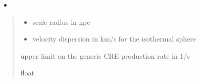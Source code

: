 \documentclass[letterpaper,10pt,english]{sphinxmanual}
\begin{document}
\begin{fulllineitems}
\begin{quote}
\begin{description}
\end{description}\end{quote}
\begin{itemize}
\item {} 
\sphinxAtStartPar
{}

\end{itemize}
\begin{quote}\begin{description}
\begin{itemize}
\item {} 
\sphinxAtStartPar
{} \textendash{} scale radius in kpc

\item {} 
\sphinxAtStartPar
{} \textendash{} velocity dispersion in km/s for the isothermal sphere {\hyperref[\detokenize{diffsph.profiles:diffsph.profiles.templates.sis}]{}}

\end{itemize}

\sphinxAtStartPar
upper limit on the generic CRE production rate in 1/s

\sphinxAtStartPar
float

\end{description}\end{quote}

\end{fulllineitems}

\end{document}
